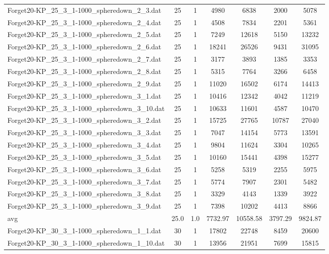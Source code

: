 \begin{table}[!ht]
\begin{tabular}{lcccccc}
Forget20-KP\_25\_3\_1-1000\_spheredown\_2\_3.dat & 25 & 1 & 4980 & 6838 & 2000 & 5078 \\
Forget20-KP\_25\_3\_1-1000\_spheredown\_2\_4.dat & 25 & 1 & 4508 & 7834 & 2201 & 5361 \\
Forget20-KP\_25\_3\_1-1000\_spheredown\_2\_5.dat & 25 & 1 & 7249 & 12618 & 5150 & 13232 \\
Forget20-KP\_25\_3\_1-1000\_spheredown\_2\_6.dat & 25 & 1 & 18241 & 26526 & 9431 & 31095 \\
Forget20-KP\_25\_3\_1-1000\_spheredown\_2\_7.dat & 25 & 1 & 3177 & 3893 & 1385 & 3353 \\
Forget20-KP\_25\_3\_1-1000\_spheredown\_2\_8.dat & 25 & 1 & 5315 & 7764 & 3266 & 6458 \\
Forget20-KP\_25\_3\_1-1000\_spheredown\_2\_9.dat & 25 & 1 & 11020 & 16502 & 6174 & 14413 \\
Forget20-KP\_25\_3\_1-1000\_spheredown\_3\_1.dat & 25 & 1 & 10416 & 12342 & 4042 & 11219 \\
Forget20-KP\_25\_3\_1-1000\_spheredown\_3\_10.dat & 25 & 1 & 10633 & 11601 & 4587 & 10470 \\
Forget20-KP\_25\_3\_1-1000\_spheredown\_3\_2.dat & 25 & 1 & 15725 & 27765 & 10787 & 27040 \\
Forget20-KP\_25\_3\_1-1000\_spheredown\_3\_3.dat & 25 & 1 & 7047 & 14154 & 5773 & 13591 \\
Forget20-KP\_25\_3\_1-1000\_spheredown\_3\_4.dat & 25 & 1 & 9804 & 11624 & 3304 & 10265 \\
Forget20-KP\_25\_3\_1-1000\_spheredown\_3\_5.dat & 25 & 1 & 10160 & 15441 & 4398 & 15277 \\
Forget20-KP\_25\_3\_1-1000\_spheredown\_3\_6.dat & 25 & 1 & 5258 & 5319 & 2255 & 5975 \\
Forget20-KP\_25\_3\_1-1000\_spheredown\_3\_7.dat & 25 & 1 & 5774 & 7907 & 2301 & 5482 \\
Forget20-KP\_25\_3\_1-1000\_spheredown\_3\_8.dat & 25 & 1 & 3329 & 4143 & 1339 & 3922 \\
Forget20-KP\_25\_3\_1-1000\_spheredown\_3\_9.dat & 25 & 1 & 7398 & 10202 & 4413 & 8866 \\
\cline{1-9} avg & 25.0 & 1.0 & 7732.97& 10558.58 & 3797.29& 9824.87\\ \hline
Forget20-KP\_30\_3\_1-1000\_spheredown\_1\_1.dat & 30 & 1 & 17802 & 22748 & 8459 & 20600 \\
Forget20-KP\_30\_3\_1-1000\_spheredown\_1\_10.dat & 30 & 1 & 13956 & 21951 & 7699 & 15815 \\

\end{tabular}
\end{table}
